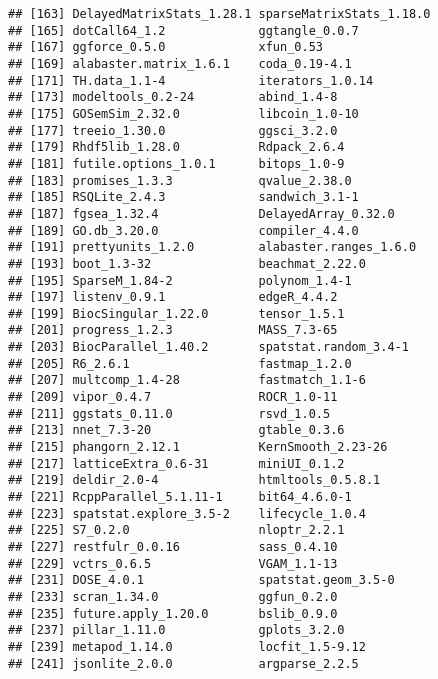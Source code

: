 \documentclass[
  11pt,
  a4paper,
]{article}
\begin{document}
\begin{verbatim}
## [163] DelayedMatrixStats_1.28.1 sparseMatrixStats_1.18.0 
## [165] dotCall64_1.2             ggtangle_0.0.7           
## [167] ggforce_0.5.0             xfun_0.53                
## [169] alabaster.matrix_1.6.1    coda_0.19-4.1            
## [171] TH.data_1.1-4             iterators_1.0.14         
## [173] modeltools_0.2-24         abind_1.4-8              
## [175] GOSemSim_2.32.0           libcoin_1.0-10           
## [177] treeio_1.30.0             ggsci_3.2.0              
## [179] Rhdf5lib_1.28.0           Rdpack_2.6.4             
## [181] futile.options_1.0.1      bitops_1.0-9             
## [183] promises_1.3.3            qvalue_2.38.0            
## [185] RSQLite_2.4.3             sandwich_3.1-1           
## [187] fgsea_1.32.4              DelayedArray_0.32.0      
## [189] GO.db_3.20.0              compiler_4.4.0           
## [191] prettyunits_1.2.0         alabaster.ranges_1.6.0   
## [193] boot_1.3-32               beachmat_2.22.0          
## [195] SparseM_1.84-2            polynom_1.4-1            
## [197] listenv_0.9.1             edgeR_4.4.2              
## [199] BiocSingular_1.22.0       tensor_1.5.1             
## [201] progress_1.2.3            MASS_7.3-65              
## [203] BiocParallel_1.40.2       spatstat.random_3.4-1    
## [205] R6_2.6.1                  fastmap_1.2.0            
## [207] multcomp_1.4-28           fastmatch_1.1-6          
## [209] vipor_0.4.7               ROCR_1.0-11              
## [211] ggstats_0.11.0            rsvd_1.0.5               
## [213] nnet_7.3-20               gtable_0.3.6             
## [215] phangorn_2.12.1           KernSmooth_2.23-26       
## [217] latticeExtra_0.6-31       miniUI_0.1.2             
## [219] deldir_2.0-4              htmltools_0.5.8.1        
## [221] RcppParallel_5.1.11-1     bit64_4.6.0-1            
## [223] spatstat.explore_3.5-2    lifecycle_1.0.4          
## [225] S7_0.2.0                  nloptr_2.2.1             
## [227] restfulr_0.0.16           sass_0.4.10              
## [229] vctrs_0.6.5               VGAM_1.1-13              
## [231] DOSE_4.0.1                spatstat.geom_3.5-0      
## [233] scran_1.34.0              ggfun_0.2.0              
## [235] future.apply_1.20.0       bslib_0.9.0              
## [237] pillar_1.11.0             gplots_3.2.0             
## [239] metapod_1.14.0            locfit_1.5-9.12          
## [241] jsonlite_2.0.0            argparse_2.2.5
\end{verbatim}
\end{document}
